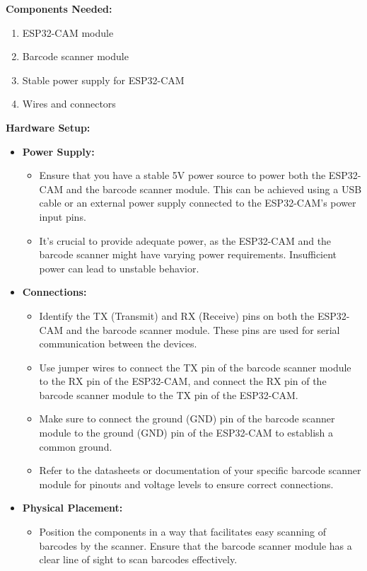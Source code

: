 \bigskip

\textbf{Components Needed:}

\begin{enumerate}
    \item ESP32-CAM module
    \item Barcode scanner module
    \item Stable power supply for ESP32-CAM
    \item Wires and connectors
\end{enumerate}

\textbf{Hardware Setup:}

\begin{itemize}
    \item \textbf{Power Supply:}
    \begin{itemize}
        \item Ensure that you have a stable 5V power source to power both the ESP32-CAM and the barcode scanner module. This can be achieved using a USB cable or an external power supply connected to the ESP32-CAM's power input pins.
        \item It's crucial to provide adequate power, as the ESP32-CAM and the barcode scanner might have varying power requirements. Insufficient power can lead to unstable behavior.
    \end{itemize}
    \item \textbf {Connections:}
    \begin{itemize}
        \item Identify the TX (Transmit) and RX (Receive) pins on both the ESP32-CAM and the barcode scanner module. These pins are used for serial communication between the devices.
        \item Use jumper wires to connect the TX pin of the barcode scanner module to the RX pin of the ESP32-CAM, and connect the RX pin of the barcode scanner module to the TX pin of the ESP32-CAM.
        \item Make sure to connect the ground (GND) pin of the barcode scanner module to the ground (GND) pin of the ESP32-CAM to establish a common ground.
        \item Refer to the datasheets or documentation of your specific barcode scanner module for pinouts and voltage levels to ensure correct connections.
    \end{itemize}
    \item \textbf {Physical Placement:}
    \begin{itemize}
        \item Position the components in a way that facilitates easy scanning of barcodes by the scanner. Ensure that the barcode scanner module has a clear line of sight to scan barcodes effectively.

\end{itemize}
\end{itemize}
